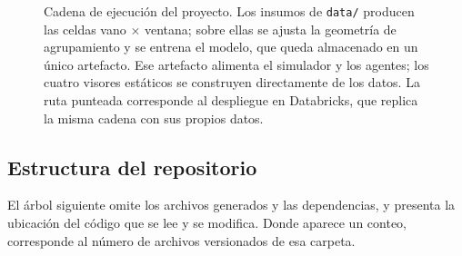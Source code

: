 \documentclass[11pt,a4paper]{article}
\begin{document}
\begin{figure}[H]
\begin{tikzpicture}[node distance=5mm and 9mm]
\end{tikzpicture}
\caption{Cadena de ejecución del proyecto. Los insumos de \texttt{data/} producen las celdas
vano $\times$ ventana; sobre ellas se ajusta la geometría de agrupamiento y se entrena el
modelo, que queda almacenado en un único artefacto. Ese artefacto alimenta el simulador y los
agentes; los cuatro visores estáticos se construyen directamente de los datos. La ruta
punteada corresponde al despliegue en Databricks, que replica la misma cadena con sus propios
datos.}
\label{fig:arquitectura}
\end{figure}

\subsection{Estructura del repositorio}

El árbol siguiente omite los archivos generados y las dependencias, y presenta la ubicación
del código que se lee y se modifica. Donde aparece un conteo, corresponde al número de
archivos versionados de esa carpeta.
\end{document}
